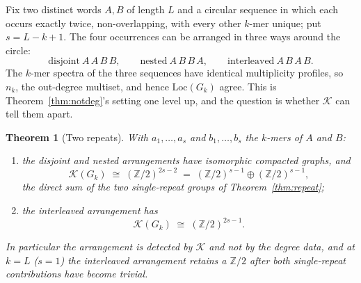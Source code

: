 \documentclass[11pt]{article}
\theoremstyle{plain}
\newtheorem{theorem}{Theorem}
\theoremstyle{definition}
\theoremstyle{remark}
\newcommand{\Z}{\mathbb{Z}}
\newcommand{\K}{\mathcal{K}}
\newcommand{\Loc}{\mathrm{Loc}}
\begin{document}
Fix two distinct words $A,B$ of length $L$ and a circular sequence in which each occurs
exactly twice, non-overlapping, with every other $k$-mer unique; put $s=L-k+1$. The four
occurrences can be arranged in three ways around the circle:
\[
\text{disjoint}\ A\,A\,B\,B,\qquad \text{nested}\ A\,B\,B\,A,\qquad
\text{interleaved}\ A\,B\,A\,B.
\]
The $k$-mer spectra of the three sequences have identical multiplicity profiles, so
$n_k$, the out-degree multiset, and hence $\Loc(G_k)$ agree. This is Theorem~\ref{thm:notdeg}'s
setting one level up, and the question is whether $\K$ can tell them apart.

\begin{theorem}[Two repeats]\label{thm:interleave}
With $a_1,\dots,a_s$ and $b_1,\dots,b_s$ the $k$-mers of $A$ and $B$:
\begin{enumerate}
\item[(i)] the disjoint and nested arrangements have isomorphic compacted graphs, and
\[
\K(G_k)\;\cong\;(\Z/2)^{2s-2}\;=\;(\Z/2)^{s-1}\oplus(\Z/2)^{s-1},
\]
the direct sum of the two single-repeat groups of Theorem~\ref{thm:repeat};
\item[(ii)] the interleaved arrangement has
\[
\K(G_k)\;\cong\;(\Z/2)^{2s-1}.
\]
\end{enumerate}
In particular the arrangement is detected by $\K$ and not by the degree data, and at
$k=L$ ($s=1$) the interleaved arrangement retains a $\Z/2$ after both single-repeat
contributions have become trivial.
\end{theorem}
\end{document}
